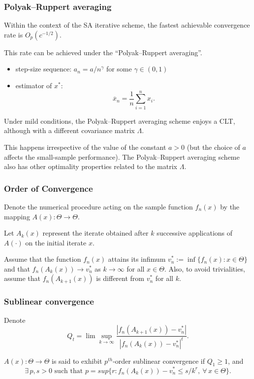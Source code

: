 \documentclass[usepdftitle=false, aspectratio=169]{beamer}
\begin{document}
\begin{frame}
\frametitle{Polyak–Ruppert averaging}

Within the context of the SA iterative scheme, the fastest achievable convergence rate is $O_p(c^{-1/2})$.

\mbox{}

This rate can be achieved under the ``Polyak–Ruppert averaging''.
\begin{itemize}
	\item 
step-size sequence: $a_n = a/{n^{\gamma}}$ for some $\gamma \in (0,1)$
\item
estimator of ${x}^*$:
$$
\overline{x}_n = \frac{1}{n} \sum_{i = 1}^n x_i.
$$
\end{itemize}

Under mild conditions, the Polyak–Ruppert averaging scheme enjoys a CLT, although with a different covariance matrix $\Lambda$.

\mbox{}

This happens irrespective of the value of the constant $a > 0$ (but the choice of $a$ affects the small-sample performance).
The Polyak–Ruppert averaging scheme also has other optimality properties related to
the matrix $\Lambda$.

\end{frame}

\begin{frame}
\frametitle{Order of Convergence}

Denote the numerical procedure acting on the sample function $f_n(x)$ by the mapping
$A(x) : \Theta \rightarrow \Theta$.

\mbox{}

Let $A_k(x)$ represent the iterate obtained after $k$ successive applications
of $A(\cdot)$ on the initial iterate $x$.

\mbox{}

Assume that the function $f_n(x)$ attains its infimum $v_n^{*} := \inf\{ f_n(x) : x \in \Theta\}$ and
that $f_n (A_k (x)) \rightarrow v_n^{*}$ as $k \rightarrow \infty$ for all $x \in \Theta$.
Also, to avoid trivialities, assume that
$f_n (A_{k+1} (x))$ is different from $v_n^*$ for all $k$.

\end{frame}

\begin{frame}
\frametitle{Sublinear convergence}

Denote
$$
Q_t = \lim \sup_{k \rightarrow \infty} \frac{ | f_n(A_{k+1} (x)) - v_n^* |}
{| f_n (A_k (x)) - v_n^* |^t}.
$$

\mbox{}

\begin{definition}
$A(x) : \Theta \rightarrow \Theta$ is said to exhibit $p^{th}$-order
sublinear convergence if $Q_1 \geq 1$, and
$$
\exists\,p, s > 0 \text{ such that } p = sup \{r : f_n(A_k (x)) - v^*_n \leq s/k^r,\ \forall\, x \in \Theta\}.
$$
\end{definition}

\end{frame}
\end{document}
